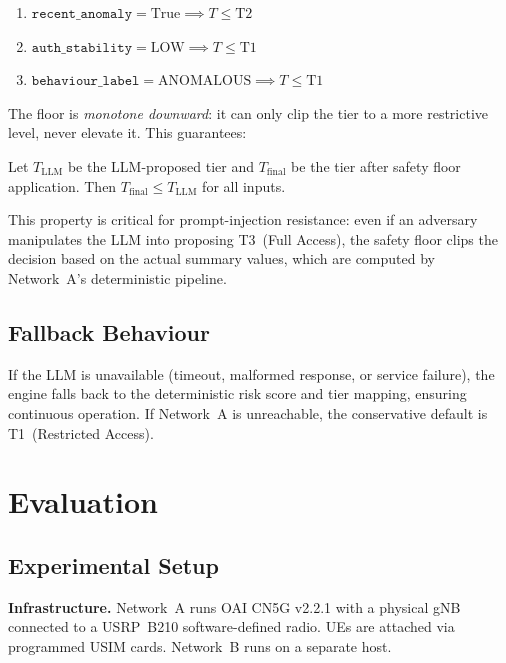 \documentclass[conference]{IEEEtran}
\begin{document}
\begin{enumerate}
    \item $\texttt{recent\_anomaly} = \text{True} \implies T \leq \text{T2}$
    \item $\texttt{auth\_stability} = \text{LOW} \implies T \leq \text{T1}$
    \item $\texttt{behaviour\_label} = \text{ANOMALOUS} \implies T \leq \text{T1}$
\end{enumerate}

The floor is \emph{monotone downward}: it can only clip the tier to a more restrictive level, never elevate it. This guarantees:

\begin{theorem}
Let $T_{\text{LLM}}$ be the LLM-proposed tier and $T_{\text{final}}$ be the tier after safety floor application. Then $T_{\text{final}} \leq T_{\text{LLM}}$ for all inputs.
\end{theorem}

This property is critical for prompt-injection resistance: even if an adversary manipulates the LLM into proposing T3~(Full Access), the safety floor clips the decision based on the actual summary values, which are computed by Network~A's deterministic pipeline.

\subsection{Fallback Behaviour}
If the LLM is unavailable (timeout, malformed response, or service failure), the engine falls back to the deterministic risk score and tier mapping, ensuring continuous operation. If Network~A is unreachable, the conservative default is T1~(Restricted Access).

\section{Evaluation}
\label{sec:evaluation}

\subsection{Experimental Setup}

\textbf{Infrastructure.} Network~A runs OAI CN5G v2.2.1 with a physical gNB connected to a USRP~B210 software-defined radio. UEs are attached via programmed USIM cards. Network~B runs on a separate host.
\end{document}
